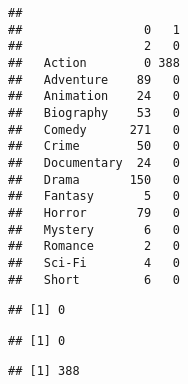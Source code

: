\documentclass[
]{article}
\newenvironment{Shaded}{\begin{snugshade}}{\end{snugshade}}
\newcommand{\DecValTok}[1]{\textcolor[rgb]{0.00,0.00,0.81}{#1}}
\newcommand{\FloatTok}[1]{\textcolor[rgb]{0.00,0.00,0.81}{#1}}
\newcommand{\KeywordTok}[1]{\textcolor[rgb]{0.13,0.29,0.53}{\textbf{#1}}}
\newcommand{\NormalTok}[1]{#1}
\newcommand{\OperatorTok}[1]{\textcolor[rgb]{0.81,0.36,0.00}{\textbf{#1}}}
\begin{document}
\begin{Shaded}
\end{Shaded}

\begin{verbatim}
##              
##                 0   1
##                 2   0
##   Action        0 388
##   Adventure    89   0
##   Animation    24   0
##   Biography    53   0
##   Comedy      271   0
##   Crime        50   0
##   Documentary  24   0
##   Drama       150   0
##   Fantasy       5   0
##   Horror       79   0
##   Mystery       6   0
##   Romance       2   0
##   Sci-Fi        4   0
##   Short         6   0
\end{verbatim}

\begin{Shaded}
\end{Shaded}

\begin{verbatim}
## [1] 0
\end{verbatim}

\begin{Shaded}
\end{Shaded}

\begin{verbatim}
## [1] 0
\end{verbatim}

\begin{Shaded}
\end{Shaded}

\begin{verbatim}
## [1] 388
\end{verbatim}
\end{document}
